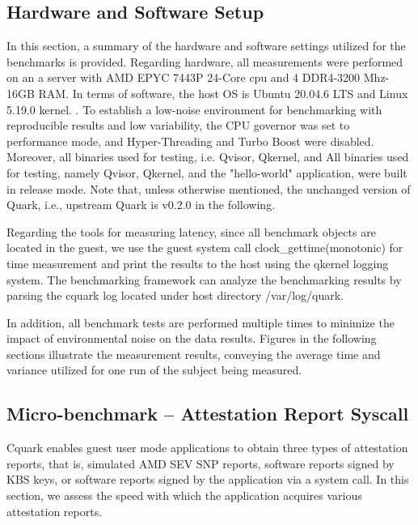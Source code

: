 \subsection{Hardware and Software Setup}

In this section, a summary of the hardware and software settings utilized for the benchmarks is provided. Regarding hardware, all measurements were performed on an a server with AMD EPYC 7443P 24-Core cpu and 4 DDR4-3200 Mhz-16GB RAM. In terms of software, the host OS is Ubuntu 20.04.6 LTS and Linux 5.19.0 kernel. . To establish a low-noise environment for benchmarking with reproducible results and low variability, the CPU governor was set to performance mode, and Hyper-Threading and Turbo Boost were disabled.  Moreover, all binaries used for testing, i.e. Qvisor, Qkernel, and All binaries used for testing, namely Qvisor, Qkernel, and the "hello-world" application, were built in release mode. Note that, unless otherwise mentioned, the unchanged version of Quark, i.e., upstream Quark is v0.2.0 in the following.


Regarding the tools for measuring latency, since all benchmark objects are located in the guest, we use the guest system call clock\_gettime(monotonic) for time measurement and print the results to the host using the qkernel logging system. The benchmarking framework can analyze the benchmarking results by parsing the cquark log located under host directory /var/log/quark.

In addition, all benchmark tests are performed multiple times to minimize the impact of environmental noise on the data results. Figures in the following sections illustrate the measurement results, conveying the average time and variance utilized for one run of the subject being measured.


\subsection{Micro-benchmark – Attestation Report Syscall}

Cquark enables guest user mode applications to obtain three types of attestation reports, that is, simulated AMD SEV SNP reports, software reports signed by KBS keys, or software reports signed by the application via a system call. In this section, we assess the speed with which the application 
acquires various attestation reports.

